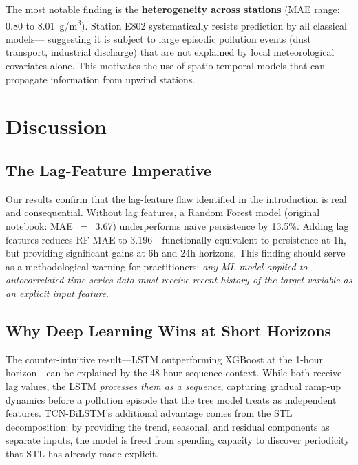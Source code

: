 \documentclass[runningheads]{llncs}
\begin{document}
The most notable finding is the \textbf{heterogeneity across stations}
(MAE range: 0.80 to 8.01~\textmu{}g/m\textsuperscript{3}).
Station E802 systematically resists prediction by all classical models—
suggesting it is subject to large episodic pollution events (dust
transport, industrial discharge) that are not explained by local
meteorological covariates alone. This motivates the use of
spatio-temporal models that can propagate information from upwind stations.

\section{Discussion}

\subsection{The Lag-Feature Imperative}
Our results confirm that the lag-feature flaw identified in the
introduction is real and consequential. Without lag features,
a Random Forest model (original notebook: MAE~$=$~3.67) underperforms
naive persistence by 13.5\%. Adding lag features reduces RF-MAE to
3.196—functionally equivalent to persistence at 1h, but providing
significant gains at 6h and 24h horizons. This finding should serve
as a methodological warning for practitioners: \emph{any ML model
applied to autocorrelated time-series data must receive recent history
of the target variable as an explicit input feature}.

\subsection{Why Deep Learning Wins at Short Horizons}
The counter-intuitive result—LSTM outperforming XGBoost at the 1-hour
horizon—can be explained by the 48-hour sequence context. While both
receive lag values, the LSTM \emph{processes them as a sequence},
capturing gradual ramp-up dynamics before a pollution episode that
the tree model treats as independent features. TCN-BiLSTM's additional
advantage comes from the STL decomposition: by providing the trend,
seasonal, and residual components as separate inputs, the model is
freed from spending capacity to discover periodicity that STL has
already made explicit.
\end{document}
